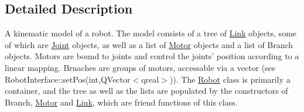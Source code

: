 \subsection{Detailed Description}
A kinematic model of a robot. The model consists of a tree of \hyperlink{class_robot_model_1_1_link}{Link} objects, some of which are \hyperlink{class_robot_model_1_1_joint}{Joint} objects, as well as a list of \hyperlink{class_robot_model_1_1_motor}{Motor} objects and a list of Branch objects. Motors are bound to joints and control the joints' position according to a linear mapping. Brnaches are groups of motors, accessable via a vector (see RobotInterface::setPos(int,QVector$<$qreal$>$)). The \hyperlink{class_robot_model_1_1_robot}{Robot} class is primarily a container, and the tree as well as the lists are populated by the constructors of Branch, \hyperlink{class_robot_model_1_1_motor}{Motor} and \hyperlink{class_robot_model_1_1_link}{Link}, which are friend functions of this class. 

